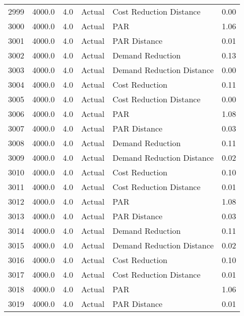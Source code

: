 \begin{longtable}{lrrllr}
2999 &       4000.0 &     4.0 &         Actual &    Cost Reduction Distance &   0.00 \\
3000 &       4000.0 &     4.0 &         Actual &                        PAR &   1.06 \\
3001 &       4000.0 &     4.0 &         Actual &               PAR Distance &   0.01 \\
3002 &       4000.0 &     4.0 &         Actual &           Demand Reduction &   0.13 \\
3003 &       4000.0 &     4.0 &         Actual &  Demand Reduction Distance &   0.00 \\
3004 &       4000.0 &     4.0 &         Actual &             Cost Reduction &   0.11 \\
3005 &       4000.0 &     4.0 &         Actual &    Cost Reduction Distance &   0.00 \\
3006 &       4000.0 &     4.0 &         Actual &                        PAR &   1.08 \\
3007 &       4000.0 &     4.0 &         Actual &               PAR Distance &   0.03 \\
3008 &       4000.0 &     4.0 &         Actual &           Demand Reduction &   0.11 \\
3009 &       4000.0 &     4.0 &         Actual &  Demand Reduction Distance &   0.02 \\
3010 &       4000.0 &     4.0 &         Actual &             Cost Reduction &   0.10 \\
3011 &       4000.0 &     4.0 &         Actual &    Cost Reduction Distance &   0.01 \\
3012 &       4000.0 &     4.0 &         Actual &                        PAR &   1.08 \\
3013 &       4000.0 &     4.0 &         Actual &               PAR Distance &   0.03 \\
3014 &       4000.0 &     4.0 &         Actual &           Demand Reduction &   0.11 \\
3015 &       4000.0 &     4.0 &         Actual &  Demand Reduction Distance &   0.02 \\
3016 &       4000.0 &     4.0 &         Actual &             Cost Reduction &   0.10 \\
3017 &       4000.0 &     4.0 &         Actual &    Cost Reduction Distance &   0.01 \\
3018 &       4000.0 &     4.0 &         Actual &                        PAR &   1.06 \\
3019 &       4000.0 &     4.0 &         Actual &               PAR Distance &   0.01 \\

\end{longtable}
